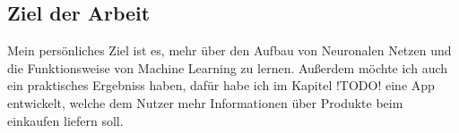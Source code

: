 \subsection{Ziel der Arbeit}

Mein persönliches Ziel ist es, mehr über den Aufbau von Neuronalen Netzen und die Funktionsweise von Machine Learning zu lernen. Außerdem möchte ich auch ein praktisches Ergebniss haben, dafür habe ich im Kapitel !TODO! eine App entwickelt, welche dem Nutzer mehr Informationen über Produkte beim einkaufen liefern soll.